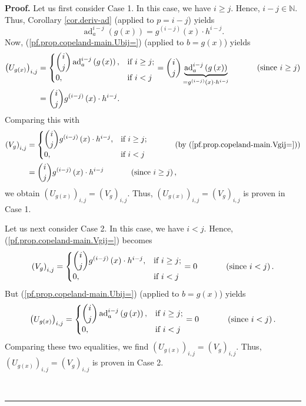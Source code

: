 \documentclass[numbers=enddot,12pt,final,onecolumn,notitlepage]{scrartcl}%
\theoremstyle{definition}
\newenvironment{proof}[1][Proof]{\noindent\textbf{#1.} }{\ \rule{0.5em}{0.5em}}
\begin{document}
\begin{proof}
Let us first consider Case 1. In this case, we have $i\geq j$. Hence,
$i-j\in\mathbb{N}$. Thus, Corollary \ref{cor.deriv-ad} (applied to $p=i-j$)
yields
\[
\operatorname*{ad}\nolimits_{a}^{i-j}\left(  g\left(  x\right)  \right)
=g^{\left(  i-j\right)  }\left(  x\right)  \cdot h^{i-j}.
\]
Now, (\ref{pf.prop.copeland-main.Ubij=}) (applied to $b=g\left(  x\right)  $)
yields%
\begin{align*}
\left(  U_{g\left(  x\right)  }\right)  _{i,j}  &  =%
\begin{cases}
\dbinom{i}{j}\operatorname*{ad}\nolimits_{a}^{i-j}\left(  g\left(  x\right)
\right)  , & \text{if }i\geq j;\\
0, & \text{if }i<j
\end{cases}
=\dbinom{i}{j}\underbrace{\operatorname*{ad}\nolimits_{a}^{i-j}\left(
g\left(  x\right)  \right)  }_{=g^{\left(  i-j\right)  }\left(  x\right)
\cdot h^{i-j}}\ \ \ \ \ \ \ \ \ \ \left(  \text{since }i\geq j\right) \\
&  =\dbinom{i}{j}g^{\left(  i-j\right)  }\left(  x\right)  \cdot h^{i-j}.
\end{align*}
Comparing this with%
\begin{align*}
\left(  V_{g}\right)  _{i,j}  &  =%
\begin{cases}
\dbinom{i}{j}g^{\left(  i-j\right)  }\left(  x\right)  \cdot h^{i-j}, &
\text{if }i\geq j;\\
0, & \text{if }i<j
\end{cases}
\ \ \ \ \ \ \ \ \ \ \left(  \text{by (\ref{pf.prop.copeland-main.Vgij=}%
)}\right) \\
&  =\dbinom{i}{j}g^{\left(  i-j\right)  }\left(  x\right)  \cdot
h^{i-j}\ \ \ \ \ \ \ \ \ \ \left(  \text{since }i\geq j\right)  ,
\end{align*}
we obtain $\left(  U_{g\left(  x\right)  }\right)  _{i,j}=\left(
V_{g}\right)  _{i,j}$. Thus, $\left(  U_{g\left(  x\right)  }\right)
_{i,j}=\left(  V_{g}\right)  _{i,j}$ is proven in Case 1.

Let us next consider Case 2. In this case, we have $i<j$. Hence,
(\ref{pf.prop.copeland-main.Vgij=}) becomes%
\[
\left(  V_{g}\right)  _{i,j}=%
\begin{cases}
\dbinom{i}{j}g^{\left(  i-j\right)  }\left(  x\right)  \cdot h^{i-j}, &
\text{if }i\geq j;\\
0, & \text{if }i<j
\end{cases}
=0\ \ \ \ \ \ \ \ \ \ \left(  \text{since }i<j\right)  .
\]
But (\ref{pf.prop.copeland-main.Ubij=}) (applied to $b=g\left(  x\right)  $)
yields%
\[
\left(  U_{g\left(  x\right)  }\right)  _{i,j}=%
\begin{cases}
\dbinom{i}{j}\operatorname*{ad}\nolimits_{a}^{i-j}\left(  g\left(  x\right)
\right)  , & \text{if }i\geq j;\\
0, & \text{if }i<j
\end{cases}
=0\ \ \ \ \ \ \ \ \ \ \left(  \text{since }i<j\right)  .
\]
Comparing these two equalities, we find $\left(  U_{g\left(  x\right)
}\right)  _{i,j}=\left(  V_{g}\right)  _{i,j}$. Thus, $\left(  U_{g\left(
x\right)  }\right)  _{i,j}=\left(  V_{g}\right)  _{i,j}$ is proven in Case 2.


\end{proof}
\end{document}
